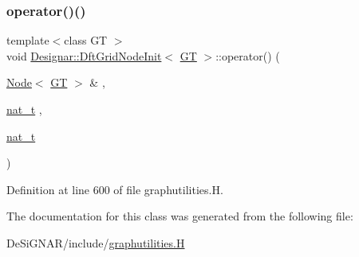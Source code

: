 \subsubsection{\texorpdfstring{operator()()}{operator()()}}
{\footnotesize\ttfamily template$<$class GT $>$ \\
void \hyperlink{class_designar_1_1_dft_grid_node_init}{Designar\+::\+Dft\+Grid\+Node\+Init}$<$ \hyperlink{demo-buildgraph_8_c_a3001c40d2c31ca87ed96cd7d1334a55e}{GT} $>$\+::operator() (\begin{DoxyParamCaption}\item[{\hyperlink{namespace_designar_a5af326c65aa2bd26b26c410f2030d09e}{Node}$<$ \hyperlink{demo-buildgraph_8_c_a3001c40d2c31ca87ed96cd7d1334a55e}{GT} $>$ \&}]{,  }\item[{\hyperlink{namespace_designar_aa72662848b9f4815e7bf31a7cf3e33d1}{nat\+\_\+t}}]{,  }\item[{\hyperlink{namespace_designar_aa72662848b9f4815e7bf31a7cf3e33d1}{nat\+\_\+t}}]{ }\end{DoxyParamCaption})\hspace{0.3cm}{\ttfamily [inline]}}



Definition at line 600 of file graphutilities.\+H.



The documentation for this class was generated from the following file\+:\begin{DoxyCompactItemize}
\item 
De\+Si\+G\+N\+A\+R/include/\hyperlink{graphutilities_8_h}{graphutilities.\+H}\end{DoxyCompactItemize}
